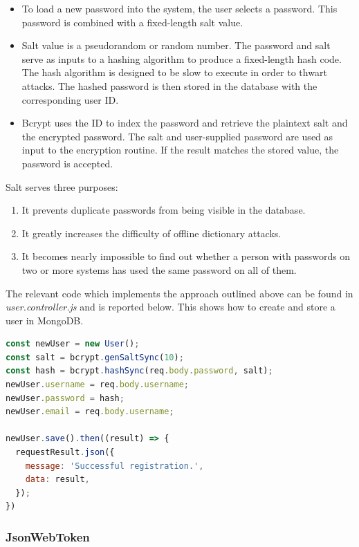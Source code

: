 \documentclass[multi, tikz, a4paper, oneside]{article}
\begin{document}
\begin{itemize}
\item To load a new password into the system, the user selects a password. This
  password is combined with a fixed-length salt value.

\item Salt value is a pseudorandom or random number. The password and salt serve
  as inputs to a hashing algorithm to produce a fixed-length hash code. The hash
  algorithm is designed to be slow to execute in order to thwart attacks. The
  hashed password is then stored in the database with the corresponding user ID.

\item Bcrypt uses the ID to index the password and retrieve the plaintext salt
  and the encrypted password. The salt and user-supplied password are used as
  input to the encryption routine. If the result matches the stored value, the
  password is accepted.
\end{itemize}

Salt serves three purposes:
\begin{enumerate}
\item It prevents duplicate passwords from being visible in the database.
\item It greatly increases the difficulty of offline dictionary attacks.
\item It becomes nearly impossible to find out whether a person with passwords
  on two or more systems has used the same password on all of them.
\end{enumerate}

The relevant code which implements the approach outlined above can be found in
{\em{user.controller.js}} and is reported below. This shows how to create and
store a user in MongoDB.

\begin{lstlisting}[language=JavaScript,caption={User registration},breaklines=true,label={code:compose}]
const newUser = new User();
const salt = bcrypt.genSaltSync(10);
const hash = bcrypt.hashSync(req.body.password, salt);
newUser.username = req.body.username;
newUser.password = hash;
newUser.email = req.body.username;

newUser.save().then((result) => {
  requestResult.json({
    message: 'Successful registration.',
    data: result,
  });
})
\end{lstlisting}

\subsubsection{JsonWebToken}
\label{sec:jsonwebtoken}
\end{document}
